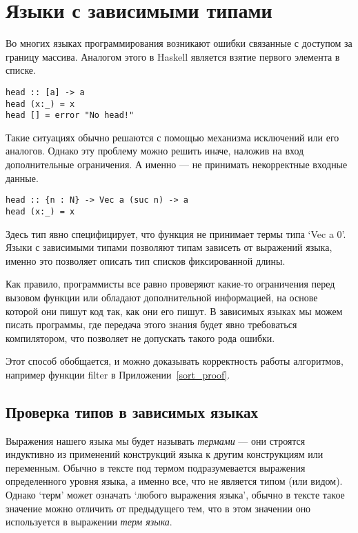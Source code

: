\section{Языки с зависимыми типами} \label{deptypes_intro}
Во многих языках программирования возникают ошибки связанные с доступом за границу массива.
Аналогом этого в Haskell является взятие первого элемента в списке.

\begin{lstlisting}[frame=single]
head :: [a] -> a
head (x:_) = x
head [] = error "No head!"
\end{lstlisting}

Такие ситуациях обычно решаются с помощью механизма исключений или его аналогов. Однако эту проблему можно решить иначе, наложив на вход дополнительные ограничения. А именно --- не принимать некорректные входные данные.

\begin{lstlisting}[frame=single]
head :: {n : N} -> Vec a (suc n) -> a
head (x:_) = x
\end{lstlisting}

Здесь тип явно специфицирует, что функция не принимает термы типа `Vec a 0'. Языки с зависимыми типами позволяют типам зависеть от выражений языка, именно это позволяет описать тип списков фиксированной длины.

Как правило, программисты все равно проверяют какие-то ограничения перед вызовом функции или обладают дополнительной информацией, на основе которой они пишут код так, как они его пишут. В зависимых языках мы можем писать программы, где передача этого знания будет явно требоваться компилятором, что позволяет не допускать такого рода ошибки.

Этот способ обобщается, и можно доказывать корректность работы алгоритмов, например функции filter в Приложении~\ref{sort_proof}.

\subsection{Проверка типов в зависимых языках}\label{typecheck}
Выражения нашего языка мы будет называть \textit{термами} --- они строятся индуктивно из применений конструкций языка к другим конструкциям или переменным. Обычно в тексте под термом подразумевается выражения определенного уровня языка, а именно все, что не является типом (или видом). Однако `терм' может означать `любого выражения языка', обычно в тексте такое значение можно отличить от предыдущего тем, что в этом значении оно используется в выражении \textit{терм языка}.

